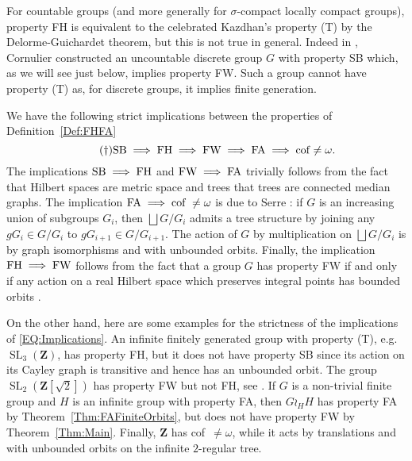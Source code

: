 \documentclass[a4paper]{article}
\theoremstyle{definition}
\DeclareMathOperator\SL{SL}
\newcommand*{\field}[1]{\mathbf{#1}}
\newcommand*{\Z}{\field{Z}}
\begin{document}
For countable groups (and more generally for $\sigma$-compact locally compact groups), property FH is equivalent to the celebrated Kazdhan's property (T) by the Delorme-Guichardet theorem, but this is not true in general. Indeed in \cite{MR2240370}, Cornulier constructed an uncountable discrete group $G$ with property SB which, as we will see just below, implies property FW. Such a group cannot have property (T) as, for discrete groups, it implies finite generation.

We have the following strict implications between the properties of Definition~\ref{Def:FHFA} %
\begin{equation}\tag{\dag}\label{EQ:Implications}
	\textnormal{SB}\implies \textnormal{FH}\implies \textnormal{FW}\implies \textnormal{FA}\implies\textnormal{cof~$\neq\omega$}.
\end{equation}
The implications $\textnormal{SB}\implies \textnormal{FH}$ and $\textnormal{FW}\implies \textnormal{FA}$ trivially follows from the fact that Hilbert spaces are metric space and trees that trees are connected median graphs.
The implication $\textnormal{FA}\implies\textnormal{cof~}\neq\omega$ is due to Serre \cite{MR0476875}: if $G$ is an increasing union of subgroups $G_i$, then $\bigsqcup G/G_i$ admits a tree structure by joining any $gG_i\in G/G_i$ to $gG_{i+1}\in G/G_{i+1}$. The action of $G$ by multiplication on $\bigsqcup G/G_i$ is by graph isomorphisms and with unbounded orbits.
Finally, the implication $\textnormal{FH}\implies \textnormal{FW}$ follows from the fact that a group $G$ has property FW if and only if any action on a real Hilbert space which preserves integral points has bounded orbits \cite{Cornulier2013}.

On the other hand, here are some examples for the strictness of the implications of \eqref{EQ:Implications}.
An infinite finitely generated group with property (T), e.g. $\SL_3(\Z)$, has property FH, but it does not have property SB since its action on its Cayley graph is transitive and hence has an unbounded orbit.
The group $\SL_2(\Z[\sqrt{2}])$ has property FW but not FH, see \cite{MR3299841}.
If $G$ is a non-trivial finite group and $H$ is an infinite group with property FA, then $G\wr_HH$ has property FA by Theorem~\ref{Thm:FAFiniteOrbits}, but does not have property FW by Theorem~\ref{Thm:Main}.
Finally, $\Z$ has cof~$\neq\omega$, while it acts by translations and with unbounded orbits on the infinite $2$-regular tree.
%
%
%
%
\end{document}
